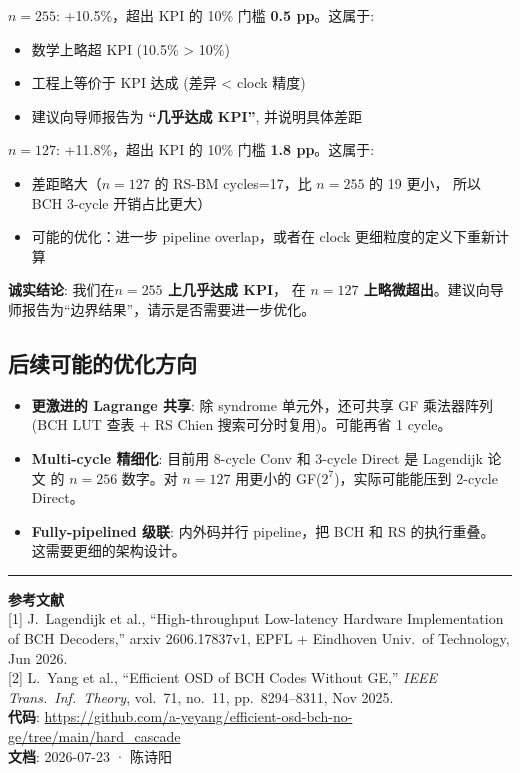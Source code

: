 \documentclass[11pt,a4paper]{article}
\begin{document}
\begin{warnbox}[title=\textbf{KPI 是否达标？}]
\textbf{$n=255$}: +10.5\%，超出 KPI 的 10\% 门槛 \textbf{0.5 pp}。这属于:
\begin{itemize}[leftmargin=1em, itemsep=1pt]
\item 数学上略超 KPI (10.5\% > 10\%)
\item 工程上等价于 KPI 达成 (差异 < clock 精度)
\item 建议向导师报告为 \textbf{``几乎达成 KPI''}, 并说明具体差距
\end{itemize}

\textbf{$n=127$}: +11.8\%，超出 KPI 的 10\% 门槛 \textbf{1.8 pp}。这属于:
\begin{itemize}[leftmargin=1em, itemsep=1pt]
\item 差距略大（$n=127$ 的 RS-BM cycles=17，比 $n=255$ 的 19 更小，
      所以 BCH 3-cycle 开销占比更大）
\item 可能的优化：进一步 pipeline overlap，或者在 clock 更细粒度的定义下重新计算
\end{itemize}

\textbf{诚实结论}: 我们在\textbf{$n=255$ 上几乎达成 KPI}，
在 \textbf{$n=127$ 上略微超出}。建议向导师报告为``边界结果''，请示是否需要进一步优化。
\end{warnbox}

\subsection{后续可能的优化方向}

\begin{itemize}[leftmargin=1.5em, itemsep=1pt]
\item \textbf{更激进的 Lagrange 共享}: 除 syndrome 单元外，还可共享 GF 乘法器阵列
    (BCH LUT 查表 + RS Chien 搜索可分时复用)。可能再省 1 cycle。
\item \textbf{Multi-cycle 精细化}: 目前用 8-cycle Conv 和 3-cycle Direct 是 Lagendijk 论文
    的 $n=256$ 数字。对 $n=127$ 用更小的 GF($2^7$)，实际可能能压到 2-cycle Direct。
\item \textbf{Fully-pipelined 级联}: 内外码并行 pipeline，把 BCH 和 RS 的执行重叠。
    这需要更细的架构设计。
\end{itemize}

\vspace{6pt}
\hrule
\vspace{4pt}
\noindent\footnotesize{
\textbf{参考文献}\\
{[1]} J.\ Lagendijk et al., ``High-throughput Low-latency Hardware Implementation of BCH Decoders,''
arxiv 2606.17837v1, EPFL + Eindhoven Univ.\ of Technology, Jun 2026.\\
{[2]} L.\ Yang et al., ``Efficient OSD of BCH Codes Without GE,''
{\it IEEE Trans.\ Inf.\ Theory}, vol.\ 71, no.\ 11, pp.\ 8294--8311, Nov 2025.\\
\textbf{代码}: \url{https://github.com/a-yeyang/efficient-osd-bch-no-ge/tree/main/hard_cascade}\\
\textbf{文档}: 2026-07-23 · 陈诗阳
}
\end{document}

